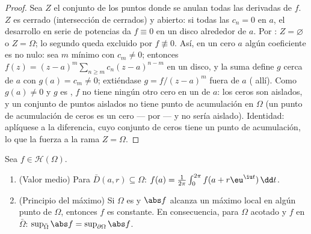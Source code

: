 \begin{proof}
Sea $Z$ el conjunto de los puntos donde se anulan todas las derivadas de
$f$. $Z$ es cerrado (intersección de cerrados) y abierto: si todas las
$c_n = 0$ en $a$, el desarrollo en serie de potencias da $f
\equiv 0$ en un disco alrededor de $a$. Por
: $Z =
\varnothing$ o $Z = \Omega$; lo segundo queda excluido por $f
\not\equiv 0$. Así, en un cero $a$ algún coeficiente es no nulo: sea $m$
mínimo con $c_m \neq 0$; entonces $f(z) = (z -
a)^m\sum_{n\geq m}c_n(z-a)^{n-m}$ en un disco, y la suma define $g$
 cerca de $a$ con
$g(a) = c_m \neq 0$; extiéndase $g = f/(z-a)^m$ fuera de $a$
( allí). Como $g(a) \neq 0$ y
$g$ es , $f$ no tiene
ningún otro cero en un  de
$a$: los ceros son aislados, y un conjunto de puntos aislados no tiene
punto de acumulación en $\Omega$ (un punto de acumulación de ceros es un
cero --- por  --- y no
sería aislado). Identidad: aplíquese a la diferencia, cuyo conjunto de
ceros tiene un punto de acumulación, lo que la fuerza a la rama
$Z = \Omega$.
\end{proof}

\begin{theorem}
\label{thm:b3:holomorphic:maximum}
Sea $f \in \mathcal H(\Omega)$.
\begin{enumerate}
  \item (Valor medio) Para $\bar D(a, r) \subseteq \Omega$:
        $f(a) = \frac1{2\pi}\int_0^{2\pi}f(a +
        r\eu^{\iu t})\,\dd t$.
  \item (Principio del máximo) Si $\Omega$ es
   y $\abs f$ alcanza un
  máximo local en algún punto de $\Omega$, entonces $f$ es constante. En
  consecuencia, para $\Omega$ acotado y $f$
   en $\bar\Omega$:
  $\sup_{\bar\Omega}\abs f =
        \sup_{\partial\Omega}\abs f$.
\end{enumerate}
\end{theorem}

